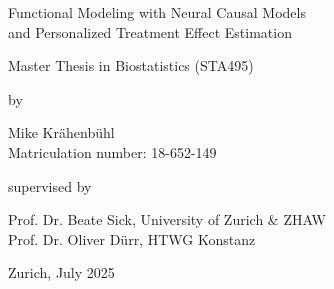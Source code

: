 \renewcommand\familydefault{\sfdefault} 


\thispagestyle{empty}
\renewcommand{\baselinestretch}{1.5}\normalfont
\begin{center}
\setlength{\parindent}{0cm}
\bf\Large%

Functional Modeling with Neural Causal Models \\
and Personalized Treatment Effect Estimation 


\normalfont



\hrulefill

\vspace*{4cm}

\large
Master Thesis in Biostatistics (STA495) %
\vspace*{12mm}

by

\vspace*{12mm}

Mike Kr{\"a}henb{\"u}hl\\
\small Matriculation number: 18-652-149\\
\normalfont
\vspace*{4cm}

supervised by

\vspace*{1cm}

Prof. Dr. Beate Sick, University of Zurich \& ZHAW \\
Prof. Dr. Oliver D{\"u}rr, HTWG Konstanz
\vfill

Zurich, July 2025
\end{center}
\renewcommand\familydefault{\rmdefault}%
\renewcommand{\baselinestretch}{1.0}\rm 
\setcounter{page}{0}
\newpage
\vspace*{12cm}~\thispagestyle{empty}
\newpage
